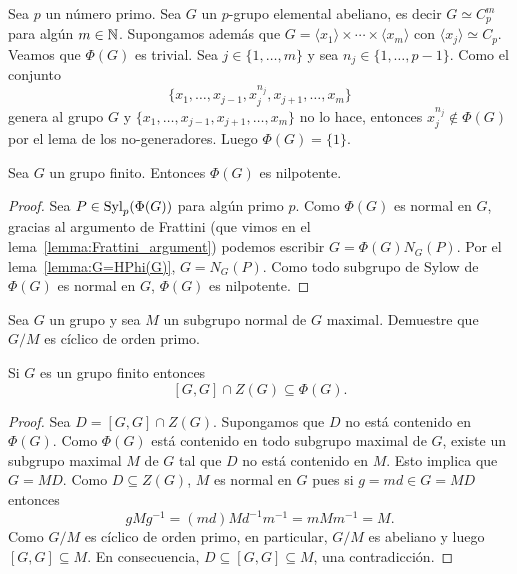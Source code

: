 \begin{example}
	Sea $p$ un número primo. Sea $G$ un $p$-grupo elemental abeliano, es decir
	$G\simeq C_p^m$ para algún $m\in\mathbb{N}$.  Supongamos además que
	$G=\langle x_1\rangle\times\cdots\times\langle x_m\rangle$ con $\langle x_j\rangle\simeq C_p$.  
	Veamos que $\Phi(G)$ es trivial. 
	Sea $j\in\{1,\dots,m\}$ y sea $n_j\in\{1,\dots,p-1\}$. Como el conjunto
	\[
	\{x_1,\dots,x_{j-1},x_j^{n_j},x_{j+1},\dots,x_m\}
	\]
	genera al grupo $G$ y $\{x_1,\dots,x_{j-1},x_{j+1},\dots,x_m\}$ no lo hace,
	entonces $x_j^{n_j}\not\in\Phi(G)$ por el lema de los no-generadores. 
	Luego $\Phi(G)=\{1\}$.
\end{example}

\begin{theorem}[Frattini]
	\label{theorem:Frattini}
	Sea $G$ un grupo finito. Entonces $\Phi(G)$ es nilpotente.
\end{theorem}

\begin{proof}
	Sea $P\in\mathrm{Syl}_p(\Phi(G))$ para algún primo $p$. Como $\Phi(G)$ es normal en
	$G$, gracias al argumento de Frattini (que vimos en el lema~\ref{lemma:Frattini_argument}) 
	podemos escribir $G=\Phi(G)N_G(P)$. Por el lema~\ref{lemma:G=HPhi(G)},
	$G=N_G(P)$. Como todo subgrupo de Sylow de $\Phi(G)$ es normal en $G$,
	$\Phi(G)$ es nilpotente.
\end{proof}

\begin{exercise}
	\label{exercise:G/M}
	Sea $G$ un grupo y sea $M$ un subgrupo normal de $G$ maximal. Demuestre que
	$G/M$ es cíclico de orden primo. 
\end{exercise}


\begin{theorem}
	\label{theorem:Gaschutz}
	Si $G$ es un grupo finito entonces 
	\[
	[G,G]\cap Z(G)\subseteq\Phi(G).
	\]
\end{theorem}

\begin{proof}
	Sea $D=[G,G]\cap Z(G)$. Supongamos que $D$ no está contenido en $\Phi(G)$.
	Como $\Phi(G)$ está contenido en todo subgrupo maximal de $G$, existe un
	subgrupo maximal $M$ de $G$ tal que $D$ no está contenido en $M$.  Esto
	implica que $G=MD$. Como $D\subseteq Z(G)$, $M$ es normal en $G$ pues si
	$g=md\in G=MD$ entonces
	\[
		gMg^{-1}=(md)Md^{-1}m^{-1}=mMm^{-1}=M.
	\]
	Como $G/M$ es cíclico de orden
	primo, en particular, $G/M$ es abeliano y luego $[G,G]\subseteq M$. En consecuencia, 
	$D\subseteq [G,G]\subseteq M$, una contradicción.
\end{proof}

